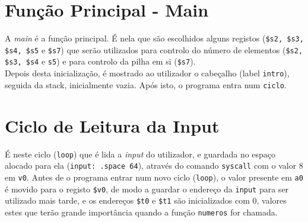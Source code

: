 \documentclass[12pt, a4paper]{article}
\begin{document}
    \section{Função Principal - Main}
    A \textit{main} é a função principal. É nela que são escolhidos alguns registos (\texttt{\$s2, \$s3, \$s4, \$s5} e \texttt{\$s7}) que serão utilizados para controlo do número de elementos (\texttt{\$s2, \$s3, \$s4} e \texttt{s5}) e para controlo da pilha em si (\texttt{\$s7}).\\
    Depois desta inicialização, é mostrado ao utilizador o cabeçalho (label \texttt{intro}), seguida da stack, inicialmente vazia.
    Após isto, o programa entra num \texttt{ciclo}.
    
    \section{Ciclo de Leitura da Input}
    É neste ciclo (\texttt{loop}) que é lida a \textit{input} do utilizador, e guardada no espaço alocado para ela (\texttt{input: .space 64}), através do comando \texttt{syscall} com o valor 8 em \texttt{v0}.
    Antes de o programa entrar num novo ciclo (\texttt{loop}), o valor presente em \texttt{a0} é movido para o registo \texttt{\$v0}, de modo a guardar o endereço da \texttt{input} para ser utilizado mais tarde, e os endereços \texttt{\$t0} e \texttt{\$t1} são inicializados com 0, valores estes que terão grande importância quando a função \texttt{numeros} for chamada.
    
\end{document}
